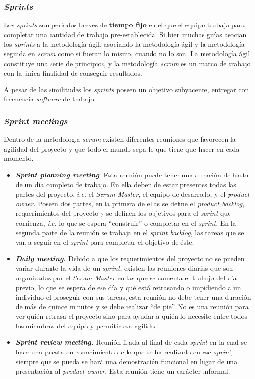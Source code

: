\subsubsection{\textit{Sprints}}
Los \textit{sprints} son periodos breves de \textbf{tiempo fijo} en el que el equipo trabaja para completar una cantidad de trabajo pre-establecida. Si bien muchas guías asocian los \textit{sprints} a la metodología ágil, asociando la metodología ágil y la metodología seguida en \textit{scrum} como si fueran lo mismo, cuando no lo son. La metodología ágil constituye una serie de principios, y la metodología \textit{scrum} es un marco de trabajo con la única finalidad de conseguir resultados.

A pesar de las similitudes los \textit{sprints} poseen un objetivo subyacente, entregar con frecuencia \textit{software} de trabajo.

\subsubsection{\textit{Sprint meetings}}
Dentro de la metodología \textit{scrum} existen diferentes reuniones que favorecen la agilidad del proyecto y que todo el mundo sepa lo que tiene que hacer en cada momento.
\begin{itemize}
\item \textbf{\textit{Sprint planning meeting.}} Esta reunión puede tener una duración de hasta de un día completo de trabajo. En ella deben de estar presentes todas las partes del proyecto, \textit{i.e.} el \textit{Scrum Master}, el equipo de desarrollo, y el \textit{product owner}. Poseen dos partes, en la primera de ellas se define el \textit{product backlog}, requerimientos del proyecto y se definen los objetivos para el \textit{sprint} que comienza, \textit{i.e.} lo que se espera ``construir'' o completar en el \textit{sprint}. En la segunda parte de la reunión se trabaja en el \textit{sprint backlog}, las tareas que se van a seguir en el \textit{sprint} para completar el objetivo de éste.
\item \textbf{\textit{Daily meeting.}} Debido a que los requerimientos del proyecto no se pueden variar durante la vida de un \textit{sprint}, existen las reuniones diarias que son organizadas por el \textit{Scrum Master} en las que se comenta el trabajo del día previo, lo que se espera de ese día y qué está retrasando o impidiendo a un individuo el proseguir con sus tareas, esta reunión no debe tener una duración de más de quince minutos y se debe realizar ``de pie''. No es una reunión para ver quién retrasa el proyecto sino para ayudar a quién lo necesite entre todos los miembros del equipo y permitir esa agilidad.
\item \textbf{\textit{Sprint review meeting.}} Reunión fijada al final de cada \textit{sprint} en la cual se hace una puesta en conocimiento de lo que se ha realizado en ese \textit{sprint}, siempre que se pueda se hará una demostración funcional en lugar de una presentación al \textit{product owner}. Esta reunión tiene un carácter informal.
\end{itemize}
 
